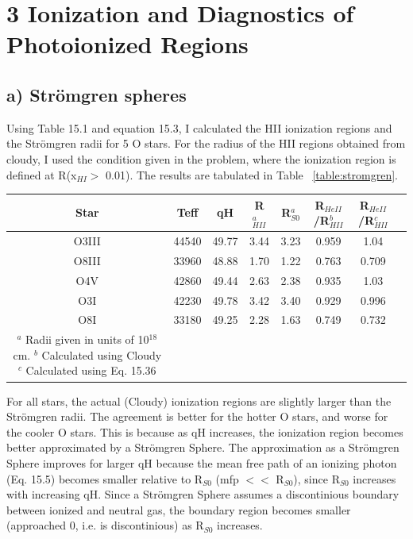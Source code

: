\documentclass[a4paper]{article}
\begin{document}
\section{3 Ionization and Diagnostics of Photoionized Regions}
\subsection{a) Str\"omgren spheres}
Using Table 15.1 and equation 15.3, I calculated the HII ionization regions
and the Str\"omgren radii for 5 O stars. For the radius of the HII regions
obtained from cloudy, I used the condition given in the problem, where
the ionization region is defined at R(x$_{HI} > $ 0.01). The results are 
tabulated in Table ~\ref{table:stromgren}.

\begin{tabular}{c c c c c c c c}
\label{table:stromgren}
Star & Teff & qH & R$_{HII}^a$ & R$_{S0}^a$ & R$_{HeII}$/R$_{HII}^{b}$ & R$_{HeII}$/R$_{HII}^{c}$ \\
\hline
O3III & 44540 & 49.77 & 3.44 & 3.23 & 0.959 & 1.04\\
O8III & 33960 & 48.88 & 1.70 & 1.22 & 0.763 & 0.709\\
O4V & 42860 & 49.44 & 2.63 & 2.38 & 0.935 & 1.03\\
O3I & 42230 & 49.78 & 3.42 & 3.40 & 0.929 & 0.996\\
O8I & 33180 & 49.25 & 2.28 & 1.63 & 0.749 & 0.732 \\
\hline 
\caption{$^a$ Radii given in units of 10$^{18}$ cm.\\$^b$ Calculated using Cloudy\\$^c$ Calculated using Eq. 15.36 }
\end{tabular}

For all stars, the actual (Cloudy) ionization regions are slightly larger than the Str\"omgren
radii. The agreement is better for the hotter O stars, and worse for the cooler O stars. This is
because as qH increases, the ionization region becomes better approximated by a Str\"omgren Sphere.
The approximation as a Str\"omgren Sphere improves for larger qH because the mean free
path of an ionizing photon (Eq. 15.5) becomes smaller relative to R$_{S0}$ (mfp $<<$ R$_{S0}$), since
R$_{S0}$ increases with increasing qH. Since
a Str\"omgren Sphere assumes a discontinious boundary between ionized and neutral gas,
the boundary region becomes smaller (approached 0, i.e. is discontinious) as R$_{S0}$ increases. 
\end{document}
